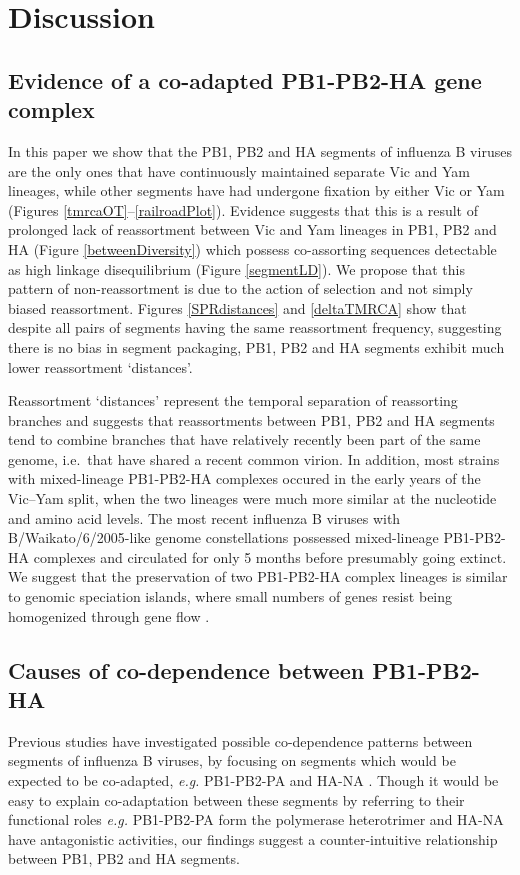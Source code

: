 \documentclass[11pt,oneside,letterpaper]{article}
\begin{document}
\section*{Discussion}

\subsection*{Evidence of a co-adapted PB1-PB2-HA gene complex}
In this paper we show that the PB1, PB2 and HA segments of influenza B viruses are the only ones that have continuously maintained separate Vic and Yam lineages, while other segments have had undergone fixation by either Vic or Yam (Figures \ref{tmrcaOT}--\ref{railroadPlot}).
Evidence suggests that this is a result of prolonged lack of reassortment between Vic and Yam lineages in PB1, PB2 and HA (Figure \ref{betweenDiversity}) which possess co-assorting sequences detectable as high linkage disequilibrium (Figure \ref{segmentLD}).
We propose that this pattern of non-reassortment is due to the action of selection and not simply biased reassortment.
Figures \ref{SPRdistances} and \ref{deltaTMRCA} show that despite all pairs of segments having the same reassortment frequency, suggesting there is no bias in segment packaging, PB1, PB2 and HA segments exhibit much lower reassortment `distances'.

Reassortment `distances' represent the temporal separation of reassorting branches and suggests that reassortments between PB1, PB2 and HA segments tend to combine branches that have relatively recently been part of the same genome, i.e.\ that have shared a recent common virion.
In addition, most strains with mixed-lineage PB1-PB2-HA complexes occured in the early years of the Vic--Yam split, when the two lineages were much more similar at the nucleotide and amino acid levels.
The most recent influenza B viruses with B/Waikato/6/2005-like genome constellations possessed mixed-lineage PB1-PB2-HA complexes and circulated for only 5 months before presumably going extinct.
We suggest that the preservation of two PB1-PB2-HA complex lineages is similar to genomic speciation islands, where small numbers of genes resist being homogenized through gene flow \cite{turner2005}.

\subsection*{Causes of co-dependence between PB1-PB2-HA}
Previous studies have investigated possible co-dependence patterns between segments of influenza B viruses, by focusing on segments which would be expected to be co-adapted, \textit{e.g.} PB1-PB2-PA and HA-NA \cite{mccullers2004}.
Though it would be easy to explain co-adaptation between these segments by referring to their functional roles \textit{e.g.} PB1-PB2-PA form the polymerase heterotrimer and HA-NA have antagonistic activities, our findings suggest a counter-intuitive relationship between PB1, PB2 and HA segments.
\end{document}
